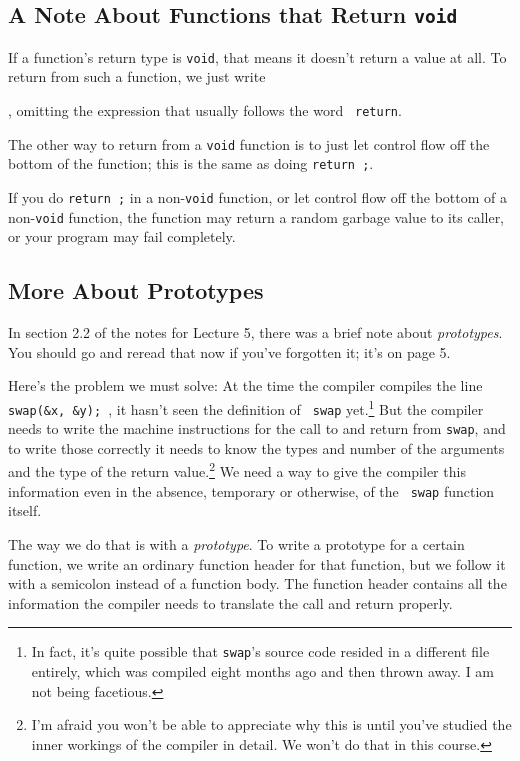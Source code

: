 \subsection{A Note About Functions that Return {\tt void}}

If a function's return type is {\tt void}, that means it doesn't return
a value at all.  To return from such a function, we just write 

\begin{flushleft}
\verb% return ; %
\end{flushleft}

\noindent , omitting the expression that usually follows the word {\tt
return}.

The other way to return from a {\tt void} function is to just let
control flow off the bottom of the function; this is the same as doing
{\tt return~;}.  

If you do {\tt return~;} in a non-{\tt void} function, or let control
flow off the bottom of a non-{\tt void} function, the function may
return a random garbage value to its caller, or your program may fail
completely.

\subsection{More About Prototypes}

In section 2.2 of the notes for Lecture 5, there was a brief note about
{\em prototypes}\/.  You should go and reread that now if you've
forgotten it; it's on page 5.

Here's the problem we must solve: At the time the compiler compiles the
line {\tt swap(\&x, \&y); }, it hasn't seen the definition of {\tt
swap} yet.\footnote{In fact, it's quite possible that {\tt swap}'s
source code resided in a different file entirely, which was compiled
eight months ago and then thrown away.  I am not being facetious.} But
the compiler needs to write the machine instructions for the call to and
return from {\tt swap}, and to write those correctly it needs to know
the types and number of the arguments and the type of the return
value.\footnote{I'm afraid you won't be able to appreciate why this is
until you've studied the inner workings of the compiler in detail.  We
won't do that in this course.} We need a way to give the compiler this
information even in the absence, temporary or otherwise, of the {\tt
swap} function itself.

The way we do that is with a {\em prototype}\/.  To write a prototype
for a certain function, we write an ordinary function header for that
function, but we follow it with a semicolon instead of a function body.
The function header contains all the information the compiler needs to
translate the call and return properly.

